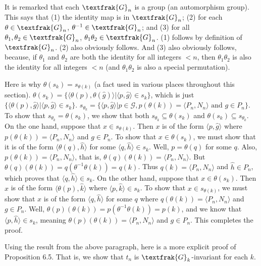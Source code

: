 \documentclass{article}
\theoremstyle{definition}
\begin{document}
It is remarked that each $\textfrak{G}_n$ is a group (an automorphism group). This says that (1) 
the identity map is in $\textfrak{G}_n$; (2) for each $\theta\in\textfrak{G}_n$, $\theta^{-1}\in\textfrak{G}_n$; and 
(3) for all $\theta_1,\theta_2\in\textfrak{G}_n$, $\theta_1\theta_2\in\textfrak{G}_n$. (1) follows by definition 
of $\textfrak{G}_n$. (2) also obviously follows. And (3) also obviously follows, because, if 
$\theta_1$ and $\theta_2$ are both the identity for all integers $<n$, then 
$\theta_1\theta_2$ is also the identity for all integers $<n$ (and $\theta_1\theta_2$ is also 
a special permutation).

Here is why $\theta(s_k)=s_{\theta(k)}$ (a fact used in various places throughout this section). 
$\theta(s_k)=\{\langle\theta(p),\theta(\hat{g})\rangle|\langle p,\hat{g}\rangle\in s_k\}$, which is 
just $\{\langle\theta(p),\hat{g}\rangle|\langle p,\hat{g}\rangle\in s_k\}$.
$s_{\theta_k}=\{\langle p,\hat{g}\rangle|p\in\mathcal{G},p(\theta(k))=\langle P_n,N_n\rangle\textrm{ and }g\in P_n\}$. To show that 
$s_{\theta_k}=\theta(s_k)$, we show that both $s_{\theta_k}\subseteq\theta(s_k)$ and 
$\theta(s_k)\subseteq s_{\theta_k}$. On the one hand, suppose that 
$x\in s_{\theta(k)}$. Then $x$ is of the form $\langle p,\hat{g}\rangle$ where 
$p(\theta(k))=\langle P_n,N_n\rangle$ and $g\in P_n$. To show that 
$x\in\theta(s_k)$, we must show that it is of the form $\langle\theta(q),\hat{h}\rangle$ for some $\langle q,\hat{h}\rangle\in s_k$.
Well, $p=\theta(q)$ for some $q$. Also, $p(\theta(k))=\langle P_n,N_n\rangle$, that is, 
$\theta(q)(\theta(k))=\langle P_n,N_n\rangle$. But $\theta(q)(\theta(k))=q(\theta^{-1}\theta(k))=q(k)$. Thus 
$q(k)=\langle P_n,N_n\rangle$ and $\hat{h}\in P_n$, which proves that $\langle q,\hat{h}\rangle\in s_k$. On the other hand, 
suppose that $x\in\theta(s_k)$. Then $x$ is of the form $\langle\theta(p),\hat{k}\rangle$ where 
$\langle p,\hat{k}\rangle\in s_k$. To show that $x\in s_{\theta(k)}$, we must show that
$x$ is of the form $\langle q,\hat{h}\rangle$ for some $q$ where $q(\theta(k))=\langle P_n,N_n\rangle$ and 
$g\in P_n$. Well, $\theta(p)(\theta(k))=p(\theta^{-1}\theta(k))=p(k)$, and we know that 
$\langle p,\hat{h}\rangle\in s_k$, meaning $\theta(p)(\theta(k))=\langle P_n,N_n\rangle$ and $g\in P_n$. This completes the proof.

Using the result from the above paragraph, here is a more explicit proof of Proposition 6.5. That is, we show that 
$t_n$ is $\textfrak{G}_k$-invariant for each $k$. 
\end{document}
